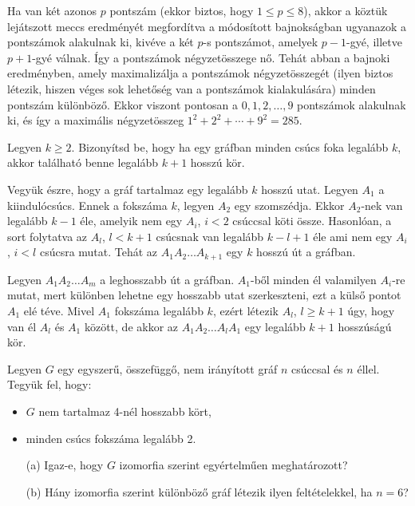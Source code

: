 \begin{solution}
Ha van két azonos $p$ pontszám (ekkor biztos, hogy $1\leq p\leq8$),
akkor a köztük lejátszott meccs eredményét megfordítva a módosított
bajnokságban ugyanazok a pontszámok alakulnak ki, kivéve a két $p$-s
pontszámot, amelyek $p-1$-gyé, illetve $p+1$-gyé válnak. Így a pontszámok
négyzetösszege nő. Tehát abban a bajnoki eredményben, amely maximalizálja
a pontszámok négyzetösszegét (ilyen biztos létezik, hiszen véges sok
lehetőség van a pontszámok kialakulására) minden pontszám különböző.
Ekkor viszont pontosan a $0,1,2,\ldots,9$ pontszámok alakulnak ki,
és így a maximális négyzetösszeg $1^{2}+2^{2}+\cdots+9^{2}=285$. 
\end{solution}
\begin{extraproblem}
Legyen $k\geq2$. Bizonyítsd be, hogy ha egy gráfban minden csúcs
foka legalább $k$, akkor található benne legalább $k+1$ hosszú kör. 
\end{extraproblem}

\begin{solution}
Vegyük észre, hogy a gráf tartalmaz egy legalább $k$ hosszú utat.
Legyen $A_{1}$ a kiindulócsúcs. Ennek a fokszáma $k$, legyen $A_{2}$
egy szomszédja. Ekkor $A_{2}$-nek van legalább $k-1$ éle, amelyik
nem egy $A_{i}$, $i<2$ csúccsal köti össze. Hasonlóan, a sort folytatva
az $A_{l}$, $l<k+1$ csúcsnak van legalább $k-l+1$ éle ami nem egy
$A_{i}$, $i<l$ csúcsra mutat. Tehát az $A_{1}A_{2}\dots A_{k+1}$
egy $k$ hosszú út a gráfban.

Legyen $A_{1}A_{2}\dots A_{m}$ a leghosszabb út a gráfban. $A_{1}$-ből
minden él valamilyen $A_{i}$-re mutat, mert különben lehetne egy
hosszabb utat szerkeszteni, ezt a külső pontot $A_{1}$ elé téve.
Mivel $A_{1}$ fokszáma legalább $k$, ezért létezik $A_{l}$, $l\geq k+1$
úgy, hogy van él $A_{l}$ és $A_{1}$ között, de akkor az $A_{1}A_{2}\dots A_{l}A_{1}$
egy legalább $k+1$ hosszúságú kör. 
\end{solution}
\begin{extraproblem}
Legyen $G$ egy egyszerű, összefüggő, nem irányított gráf $n$ csúccsal
és $n$ éllel. Tegyük fel, hogy: 
\begin{itemize}
\item $G$ nem tartalmaz 4-nél hosszabb kört, 
\item minden csúcs fokszáma legalább 2. 
\end{itemize}
\begin{enumerate}
\item[(a)] Igaz-e, hogy $G$ izomorfia szerint egyértelműen meghatározott? 
\item[(b)] Hány izomorfia szerint különböző gráf létezik ilyen feltételekkel,
ha $n=6$? 
\end{enumerate}
\end{extraproblem}

